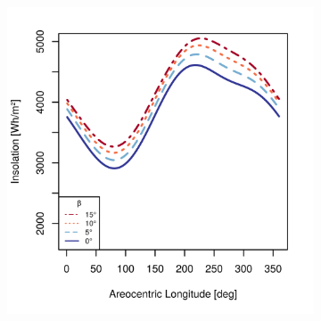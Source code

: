 \begin{figure}[h]
\captionsetup[subfigure]{justification=centering}
\vspace{-2ex}
\centering
    \setlength{\subfigureWidth}{0.50\textwidth}
    \setlength{\graphicsHeight}{77mm}
    \hypersetup{hidelinks=true}%
    \begin{subfigure}[t]{\subfigureWidth}
        \centering
            \includegraphics[height=\graphicsHeight]{sections/mars-solar-energy/mission-sites/plots/iani-chaos-solar-insolations-for-different-beta-inclinations.png}
            \label{fig:plot:sub:solar-insolations-for-different-beta-iani-chaos}
    \end{subfigure}\hfill
    \begin{subfigure}[t]{\subfigureWidth}
        \centering

\end{subfigure}
\end{figure}
